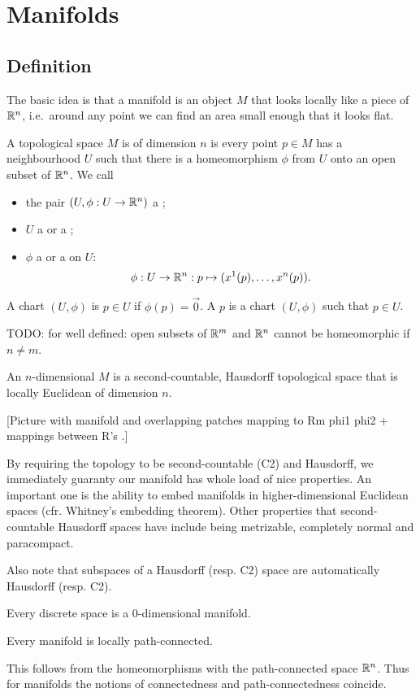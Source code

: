 \chapter{Manifolds}
\section{Definition}
The basic idea is that a manifold is an object $M$ that looks locally like a piece of $\mathbb{R}^n$, i.e.\ around any point we can find an area small enough that it looks flat.
\begin{definition}
A topological space $M$ is  of dimension $n$ is every point $p\in M$ has a neighbourhood $U$ such that there is a homeomorphism $\phi$ from $U$ onto an open subset of $\mathbb{R}^n$. We call
\begin{itemize}
\item the pair $(U,\phi:U\to \mathbb{R}^n)$ a ;
\item $U$ a  or a ;
\item $\phi$ a  or a  on $U$:
\[ \phi:U\to \mathbb{R}^n: p\mapsto (x^1(p), \ldots, x^n(p)). \]
\end{itemize}
A chart $(U,\phi)$ is  $p\in U$ if $\phi(p) = \vec{0}$. A  $p$ is a chart $(U,\phi)$ such that $p\in U$.
\end{definition}
TODO: for well defined: open subsets of $\mathbb{R}^m$ and $\mathbb{R}^n$ cannot be homeomorphic if $n\neq m$.
\begin{definition}
An $n$-dimensional  $M$ is a second-countable, Hausdorff topological space that is locally Euclidean of dimension $n$.
\end{definition}
[Picture with manifold and overlapping patches mapping to Rm phi1 phi2 + mappings between R's .]

By requiring the topology to be second-countable (C2) and Hausdorff, we immediately guaranty our manifold has whole load of nice properties. An important one is the ability to embed manifolds in higher-dimensional Euclidean spaces (cfr. Whitney's embedding theorem). Other properties that second-countable Hausdorff spaces have include being metrizable, completely normal and paracompact.

Also note that subspaces of a Hausdorff (resp. C2) space are automatically Hausdorff (resp. C2).

\begin{proposition}
Every discrete space is a $0$-dimensional manifold.
\end{proposition}
\begin{lemma}
Every manifold is locally path-connected.
\end{lemma}
This follows from the homeomorphisms with the path-connected space $\mathbb{R}^n$. Thus for manifolds the notions of connectedness and path-connectedness coincide.

